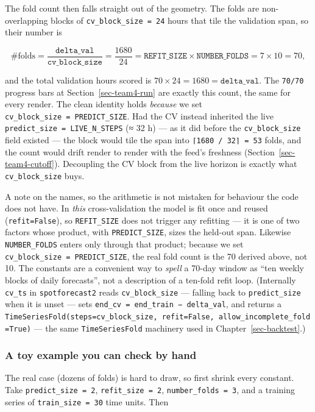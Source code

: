 \documentclass[
  english,
  letterpaper,
]{scrbook}
\begin{document}
The fold count then falls straight out of the geometry. The folds are
non-overlapping blocks of \texttt{cv\_block\_size\ =\ 24} hours that
tile the validation span, so their number is

\[
\#\text{folds}
  = \frac{\texttt{delta\_val}}{\texttt{cv\_block\_size}}
  = \frac{1680}{24}
  = \texttt{REFIT\_SIZE} \times \texttt{NUMBER\_FOLDS}
  = 7 \times 10 = 70,
\]

and the total validation hours scored is \(70 \times 24 = 1680 =
\texttt{delta\_val}\). The \texttt{70/70} progress bars at
Section~\ref{sec-team4-run} are exactly this count, the same for every
render. The clean identity holds \emph{because} we set
\texttt{cv\_block\_size\ =\ PREDICT\_SIZE}. Had the CV instead inherited
the live \texttt{predict\_size\ =\ LIVE\_N\_STEPS} (≈ 32 h) --- as it
did before the \texttt{cv\_block\_size} field existed --- the block
would tile the span into \texttt{⌈1680\ /\ 32⌉\ =\ 53} folds, and the
count would drift render to render with the feed's freshness
(Section~\ref{sec-team4-cutoff}). Decoupling the CV block from the live
horizon is exactly what \texttt{cv\_block\_size} buys.

A note on the names, so the arithmetic is not mistaken for behaviour the
code does not have. In \emph{this} cross-validation the model is fit
once and reused (\texttt{refit=False}), so \texttt{REFIT\_SIZE} does not
trigger any refitting --- it is one of two factors whose product, with
\texttt{PREDICT\_SIZE}, sizes the held-out span. Likewise
\texttt{NUMBER\_FOLDS} enters only through that product; because we set
\texttt{cv\_block\_size\ =\ PREDICT\_SIZE}, the real fold count is the
70 derived above, not 10. The constants are a convenient way to
\emph{spell} a 70-day window as ``ten weekly blocks of daily
forecasts'', not a description of a ten-fold refit loop. (Internally
\texttt{cv\_ts} in \texttt{spotforecast2} reads \texttt{cv\_block\_size}
--- falling back to \texttt{predict\_size} when it is unset --- sets
\texttt{end\_cv\ =\ end\_train\ −\ delta\_val}, and returns a
\texttt{TimeSeriesFold(steps=cv\_block\_size,\ refit=False,\ allow\_incomplete\_fold=True)}
--- the same \texttt{TimeSeriesFold} machinery used in
Chapter~\ref{sec-backtest}.)

\subsubsection{A toy example you can check by
hand}\label{a-toy-example-you-can-check-by-hand}

The real case (dozens of folds) is hard to draw, so first shrink every
constant. Take \texttt{predict\_size\ =\ 2}, \texttt{refit\_size\ =\ 2},
\texttt{number\_folds\ =\ 3}, and a training series of
\texttt{train\_size\ =\ 30} time units. Then
\end{document}
